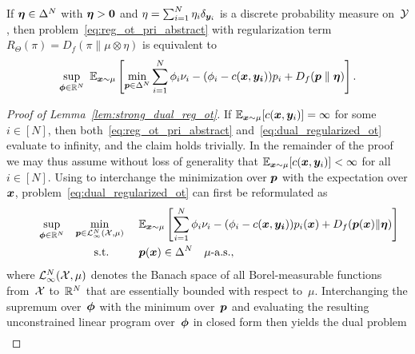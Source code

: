 \documentclass[11pt, a4paper, oneside, reqno]{article}
\begin{document}
	\begin{lemma}
		\label{lem:strong_dual_reg_ot}
		If $\boldsymbol\eta\in\Delta^N$ with $\boldsymbol\eta>\boldsymbol 0$ and $\eta = \sum_{i=1}^N \eta_i \delta_{\boldsymbol y_i}$ is a discrete probability measure on~$\mathcal{Y}$, then problem~\eqref{eq:reg_ot_pri_abstract} with regularization term $R_\Theta (\pi ) =  D_{f}(\pi\|\mu \otimes \eta)$ is equivalent to
		\begin{align}
		\label{eq:dual_regularized_ot}
		\sup\limits_{ \boldsymbol {\phi}\in \mathbb{R}^N} ~
		\mathbb{E}_{\boldsymbol x \sim \mu}\left[\min\limits_{\boldsymbol p\in \Delta^N} \sum\limits_{i=1}^N{\phi_i\nu_i}- (\phi_i - c(\boldsymbol x, \boldsymbol {y_i}))p_i +  D_f(\boldsymbol p \parallel \boldsymbol \eta)
		\right].
		\end{align}
	\end{lemma}
	\begin{proof}[Proof of Lemma~\ref{lem:strong_dual_reg_ot}]
		If $\mathbb{E}_{\boldsymbol x \sim \mu}[c(\boldsymbol x,\boldsymbol y_i)]=\infty$ for some $i\in[N]$, then both~\eqref{eq:reg_ot_pri_abstract} and~\eqref{eq:dual_regularized_ot} evaluate to infinity, and the claim holds trivially. In the remainder of the proof we may thus assume without loss of generality that $\mathbb{E}_{\boldsymbol x \sim \mu}[c(\boldsymbol x,\boldsymbol y_i)]<\infty$ for all $i\in[N]$. Using \citep[Theorem~14.6]{rockafellar2009variational} to interchange the minimization over $\boldsymbol p$ with the expectation over $\boldsymbol x$, problem~\eqref{eq:dual_regularized_ot} can first be reformulated as
		\begin{equation*}
		\begin{array}{ccccll}
		& &\sup\limits_{ \boldsymbol{\phi}\in \mathbb{R}^N} &\min\limits_{\boldsymbol p\in\mathcal L_\infty^N(\mathcal{X},\mu)} ~ &\mathbb{E}_{\boldsymbol x \sim \mu}\left[\displaystyle\sum\limits_{i=1}^N{\phi_i\nu_i} - (\phi_i - c(\boldsymbol x, \boldsymbol {y_i}))p_i(\boldsymbol x)+  D_f(\boldsymbol p(\boldsymbol x)\|\boldsymbol \eta)\right]  \\[3ex]
		&&&\textrm{s.t.} &\displaystyle \boldsymbol p(\boldsymbol x)\in\Delta^N \quad \mu\text{-a.s.},
		\end{array}
		\end{equation*}
		where $\mathcal L_\infty^N(\mathcal{X},\mu)$ denotes the Banach space of all Borel-measurable functions from~$\mathcal{X}$ to~$\mathbb{R}^N$ that are essentially bounded with respect to~$\mu$. Interchanging the supremum over~$\boldsymbol \phi$ with the minimum over~$\boldsymbol p$ and evaluating the resulting unconstrained linear program over~$\boldsymbol \phi$ in closed form then yields the dual problem 
		\begin{equation}
		\label{eq:primal_dual_relation_final}
		\begin{array}{ccl}

\end{array}
\end{equation}
\end{proof}
\end{document}
